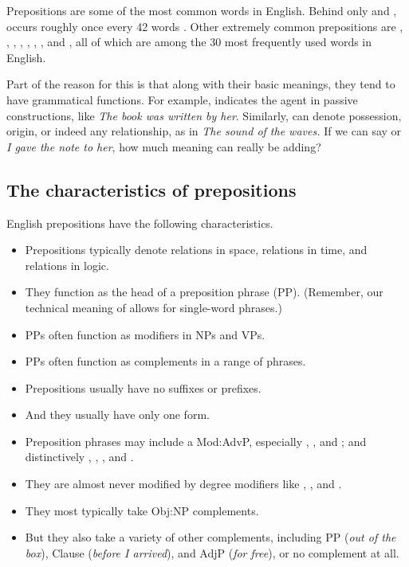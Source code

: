 
Prepositions are some of the most common words in English. Behind only  and ,  occurs roughly once every 42 words \citep{COCA}. Other extremely common prepositions are , , , , , , , and , all of which are among the 30 most frequently used words in English.

Part of the reason for this is that along with their basic meanings, they tend to have grammatical functions. For example,  indicates the agent in passive constructions, like \textit{The book was written \emph{by her}}. Similarly,  can denote possession, origin, or indeed any relationship, as in \textit{The sound \emph{of the waves}.} If we can say  or \textit{I gave the note \emph{to her}}, how much meaning can  really be adding?


\subsection{The characteristics of prepositions}\label{sec:preps}

English prepositions have the following characteristics.

\begin{itemize}[noitemsep]
   \item Prepositions typically denote relations in space, relations in time, and relations in logic.
   \item They function as the head of a preposition phrase (PP). (Remember, our technical meaning of  allows for single-word phrases.)
   \item PPs often function as modifiers in NPs and VPs.
   \item PPs often function as complements in a range of phrases.
   \item Prepositions usually have no suffixes or prefixes.
   \item And they usually have only one form.
   \item Preposition phrases may include a Mod:AdvP, especially , , and ; and distinctively , , , and .
   \item They are almost never modified by degree modifiers like , , and .
   \item They most typically take Obj:NP complements.
   \item But they also take a variety of other complements, including PP (\textit{out \emph{of the box}}), Clause (\textit{before \emph{I arrived}}), and AdjP (\textit{for \emph{free}}), or no complement at all.
\end{itemize}

